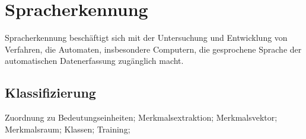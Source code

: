 \documentclass[german,color,6pt]{latex4ei/latex4ei_sheet}
\begin{document}
\columnbreak

\section{Spracherkennung}
\begin{symbolbox}
Spracherkennung beschäftigt sich mit der Untersuchung und Entwicklung von Verfahren, die Automaten, insbesondere Computern, die gesprochene Sprache der automatischen Datenerfassung zugänglich macht.
\end{symbolbox}

\begin{sectionbox}
	\subsection{Klassifizierung}
	Zuordnung zu Bedeutungseinheiten; Merkmalsextraktion; Merkmalsvektor; Merkmalsraum; Klassen; Training;
\end{sectionbox}
\end{document}
